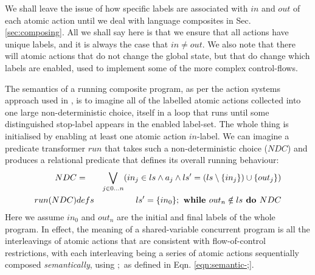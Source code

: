 We shall leave the issue of how specific labels
are associated with $in$ and $out$ of each atomic action until we
deal with language composites in Sec. \ref{sec:composing}.
All we shall say here is that we ensure that all actions have unique labels,
and it is always the case that $in \neq out$.
We also note that there will atomic actions that do not change the global
state, but that do change which labels are enabled, used to implement
some of the more complex control-flows.

The semantics of a running composite program,
as per the action systems approach used in \cite{DBLP:conf/icfem/WoodcockH02},
is to imagine all of the labelled atomic actions collected into one large
non-deterministic choice,
itself in a loop that runs until some distinguished stop-label appears
in the enabled label-set. The whole thing is initialised by enabling
at least one atomic action $in$-label.
We can imagine a predicate transformer $run$
that takes such a non-deterministic choice ($NDC$) and produces
a relational predicate that defines its overall running behaviour:
\begin{eqnarray}
   NDC
   &=&
   \bigvee_{j \in 0\dots n} (in_j \in ls
   \land
   a_j
   \land
   ls'=(ls\setminus\{{in_j}\})\cup\{{out_j}\})
\\ run(NDC)
   &defs&
   ls' = \{{in_0}\} ; \textbf{ while } out_n \notin ls \textbf{ do } NDC
\end{eqnarray}
Here we assume $in_0$ and $out_n$ are the initial and final labels of the whole
program.
In effect, the meaning of a shared-variable concurrent program
is all the interleavings of atomic actions that are consistent
with flow-of-control restrictions, with each interleaving
being a series of atomic actions sequentially composed \emph{semantically},
using $;$ as defined in Eqn. \ref{eqn:semantic-;}.
